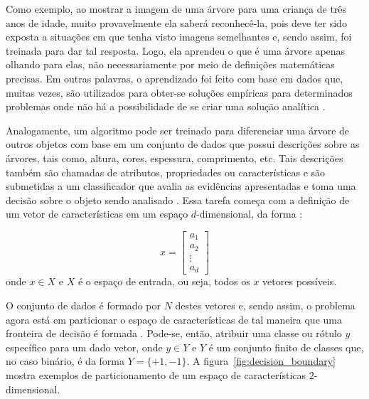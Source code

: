 Como exemplo, ao mostrar a imagem de uma árvore para uma criança de três anos de idade, muito provavelmente ela saberá reconhecê-la, pois deve ter sido exposta a situações em que tenha visto imagens semelhantes e, sendo assim, foi treinada para dar tal resposta. Logo, ela aprendeu o que é uma árvore apenas olhando para elas, não necessariamente por meio de definições matemáticas precisas. Em outras palavras, o aprendizado foi feito com base em dados que, muitas vezes, são utilizados para obter-se soluções empíricas para determinados problemas onde não há a possibilidade de se criar uma solução analítica \citep{mostafa:12}.

Analogamente, um algoritmo pode ser treinado para diferenciar uma árvore de outros objetos com base em um conjunto de dados que possui descrições sobre as árvores, tais como, altura, cores, espessura, comprimento, etc. Tais descrições também são chamadas de atributos, propriedades ou características e são submetidas a um classificador que avalia as evidências apresentadas e toma uma decisão sobre o objeto sendo analisado \citep{duda:12}. Essa tarefa começa com a definição de um vetor de características em um espaço $d$-dimensional, da forma \citep{duda:12}:

\begin{equation}
\label{eq:vetor_caracteristicas}
  x = 
  \begin{bmatrix}
    a_1 \\ a_2 \\ \vdots \\ a_d
  \end{bmatrix}
\end{equation}
\noindent onde $x \in X$ e $X$ é o espaço de entrada, ou seja, todos os $x$ vetores possíveis.

O conjunto de dados é formado por $N$ destes vetores e, sendo assim, o problema agora está em particionar o espaço de características de tal maneira que uma fronteira de decisão é formada \citep{duda:12}. Pode-se, então, atribuir uma classe ou rótulo $y$ específico para um dado vetor, onde $y \in Y$ e $Y$ é um conjunto finito de classes que, no caso binário, é da forma $Y = \{+1, -1\}$. A figura~\ref{fig:decision_boundary} mostra exemplos de particionamento de um espaço de características $2$-dimensional.

